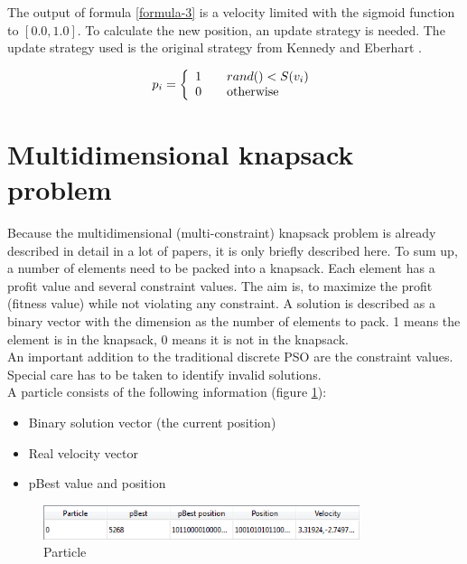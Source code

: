 \documentclass{article}
\begin{document}
The output of formula \ref{formula-3} is a velocity limited with the sigmoid function to $[0.0, 1.0]$. To calculate the new position, an update strategy is needed. The update strategy used is the original strategy from Kennedy and Eberhart \cite{bib-discrete}.

\begin{equation}
p_i = \left\{ 
\begin{array}{l l}
  1 & \quad \text{$rand() < S(v_i)$}\\
  0 & \quad \text{otherwise}
\end{array} \right.
\end{equation}


\section{Multidimensional knapsack problem}
\label{lbl-mknap}
Because the multidimensional (multi-constraint) knapsack problem is already described in detail in a lot of papers, it is only briefly described here. To sum up, a number of elements need to be packed into a knapsack. Each element has a profit value and several constraint values. The aim is, to maximize the profit (fitness value) while not violating any constraint. A solution is described as a binary vector with the dimension as the number of elements to pack. 1 means the element is in the knapsack, 0 means it is not in the knapsack. \\ An important addition to the traditional discrete PSO are the constraint values. Special care has to be taken to identify invalid solutions.\\

A particle consists of the following information (figure \ref{fig-particle}):
\begin{itemize}
\item Binary solution vector (the current position)
\item Real velocity vector
\item pBest value and position
\end{itemize}

\begin{figure}[H]
    \centering
    \includegraphics[width=350px]{images/particle.PNG}
    \caption{Particle}
    \label{fig-particle}
\end{figure}
\end{document}
